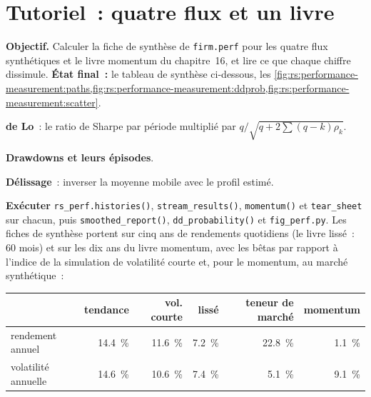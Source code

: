 \section{Tutoriel~: quatre flux et un livre}\label{tut:rs:performance-measurement:tut}

\begin{tutorial}
\textbf{Objectif.} Calculer la fiche de synthèse de \texttt{firm.perf} pour les quatre flux synthétiques et le livre momentum du chapitre~16, et lire ce que chaque chiffre dissimule.
\textbf{État final~:} le tableau de synthèse ci-dessous, les \cref{fig:rs:performance-measurement:paths,fig:rs:performance-measurement:ddprob,fig:rs:performance-measurement:scatter}.
\begin{tutsteps}
\item \textbf{ de Lo}~: le ratio de Sharpe par période multiplié par $q/\sqrt{q + 2\sum(q-k)\rho_k}$.
\label{lst:rs:performance-measurement:lo}
\item \textbf{Drawdowns et leurs épisodes}.
\label{lst:rs:performance-measurement:dd}
\item \textbf{Délissage}~: inverser la moyenne mobile avec le profil estimé.
\label{lst:rs:performance-measurement:unsmooth}
\item \textbf{Exécuter} \texttt{rs\_perf.histories()}, \texttt{stream\_results()}, \texttt{momentum()} et \texttt{tear\_sheet} sur chacun, puis \texttt{smoothed\_report()},
\texttt{dd\_probability()} et \texttt{fig\_perf.py}. Les fiches de synthèse portent sur cinq ans de rendements quotidiens (le livre lissé~: 60 mois) et sur les
dix ans du livre momentum, avec les bêtas par rapport à l'indice de la simulation de volatilité courte et, pour le momentum, au marché synthétique~:
\end{tutsteps}
\begin{center}
\small
\setlength{\tabcolsep}{4pt}%
\begin{tabular}{@{}lrrrrr@{}}
\toprule
 & tendance & vol. courte & lissé & teneur de marché & momentum\\
\midrule
rendement annuel & 14.4~\% & 11.6~\% & 7.2~\% & 22.8~\% & 1.1~\%\\
volatilité annuelle & 14.6~\% & 10.6~\% & 7.4~\% & 5.1~\% & 9.1~\%\\

\end{tabular}
\end{center}
\end{tutorial}
